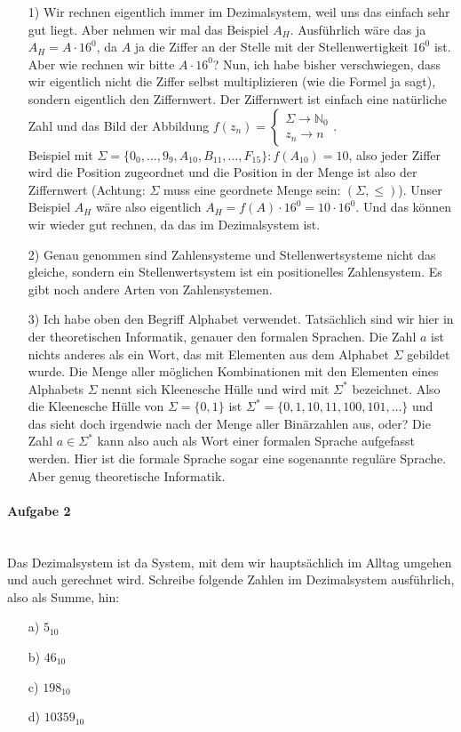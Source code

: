 \documentclass[12pt,a4paper,ngerman]{scrartcl}
\begin{document}
	\begin{itemize}
		\item[1)] Wir rechnen eigentlich immer im Dezimalsystem, weil uns das einfach sehr gut liegt. Aber nehmen wir mal das Beispiel $A_{H}$. Ausführlich wäre das ja $A_{H} = A \cdot 16^0$, da $A$ ja die Ziffer an der Stelle mit der Stellenwertigkeit $16^0$ ist. Aber wie rechnen wir bitte $A \cdot 16^0$? Nun, ich habe bisher verschwiegen, dass wir eigentlich nicht die Ziffer selbst multiplizieren (wie die Formel ja sagt), sondern eigentlich den Ziffernwert. Der Ziffernwert ist einfach eine natürliche Zahl und das Bild der Abbildung $f(z_n) = \begin{cases}
			\Sigma \rightarrow \mathbb{N}_0\\
			z_n \rightarrow n
		\end{cases}$.\\
		Beispiel mit $\Sigma = \{0_0,\dots,9_9,A_{10},B_{11},\dots,F_{15}\}: f(A_{10}) = 10$, also jeder Ziffer wird die Position zugeordnet und die Position in der Menge ist also der Ziffernwert (Achtung: $\Sigma$ muss eine geordnete Menge sein: $(\Sigma, \le)$). Unser Beispiel $A_H$ wäre also eigentlich $A_{H} = f(A) \cdot 16^0 = 10 \cdot 16^0$. Und das können wir wieder gut rechnen, da das im Dezimalsystem ist.
		
		\item[2)] Genau genommen sind Zahlensysteme und Stellenwertsysteme nicht das gleiche, sondern ein Stellenwertsystem ist ein positionelles Zahlensystem. Es gibt noch andere Arten von Zahlensystemen.
		
		\item[3)] Ich habe oben den Begriff Alphabet verwendet. Tatsächlich sind wir hier in der theoretischen Informatik, genauer den formalen Sprachen. Die Zahl $a$ ist nichts anderes als ein Wort, das mit Elementen aus dem Alphabet $\Sigma$ gebildet wurde. Die Menge aller möglichen Kombinationen mit den Elementen eines Alphabets $\Sigma$ nennt sich Kleenesche Hülle und wird mit $\Sigma^*$ bezeichnet. Also die Kleenesche Hülle von $\Sigma = \{0,1\}$ ist $\Sigma^* = \{0,1,10,11,100,101,\dots\}$ und das sieht doch irgendwie nach der Menge aller Binärzahlen aus, oder? Die Zahl $a \in \Sigma^*$ kann also auch als Wort einer formalen Sprache aufgefasst werden. Hier ist die formale Sprache sogar eine sogenannte reguläre Sprache. Aber genug theoretische Informatik.
	\end{itemize}
	
	\paragraph{Aufgabe 2}\mbox{}\\
	Das Dezimalsystem ist da System, mit dem wir hauptsächlich im Alltag umgehen und auch gerechnet wird. Schreibe folgende Zahlen im Dezimalsystem ausführlich, also als Summe, hin:
	\begin{itemize}
		\item[a)] $5_{10}$
		\item[b)] $46_{10}$
		\item[c)] $198_{10}$
		\item[d)] $10359_{10}$
	\end{itemize}
\end{document}
